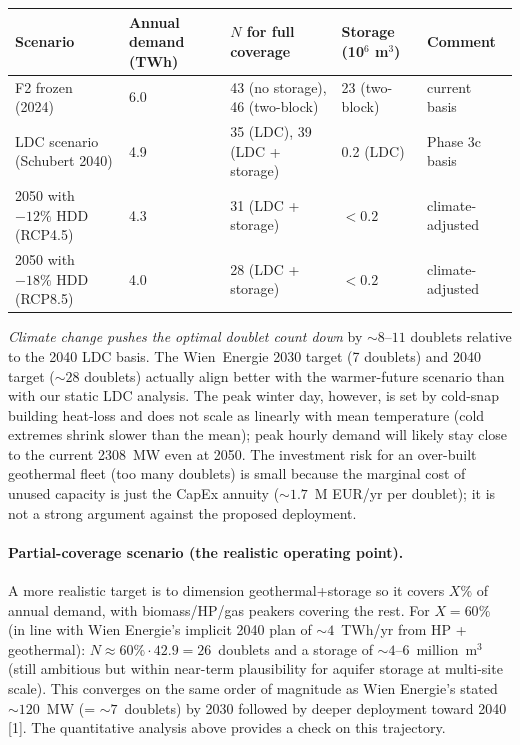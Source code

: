 \documentclass{article}
\begin{document}
\begin{center}
\begin{tabular}{lllll}
\hline
\textbf{Scenario} & \textbf{Annual demand (TWh)} & \textbf{$N$ for full coverage} & \textbf{Storage (10$^6$ m$^3$)} & \textbf{Comment} \\
\hline
F2 frozen (2024)              & 6.0  & 43 (no storage), 46 (two-block) & 23 (two-block) & current basis \\
LDC scenario (Schubert 2040)  & 4.9  & 35 (LDC), 39 (LDC + storage)    & 0.2 (LDC)      & Phase 3c basis \\
2050 with $-12\%$ HDD (RCP4.5) & 4.3 & 31 (LDC + storage)              & $< 0.2$         & climate-adjusted \\
2050 with $-18\%$ HDD (RCP8.5) & 4.0 & 28 (LDC + storage)              & $< 0.2$         & climate-adjusted \\
\hline
\end{tabular}
\end{center}

\emph{Climate change pushes the optimal doublet count \emph{down}}
by $\sim 8$--$11$ doublets relative to the 2040 LDC basis. The
Wien~Energie 2030 target (7 doublets) and 2040 target ($\sim 28$
doublets) actually align better with the warmer-future scenario
than with our static LDC analysis. The peak winter day, however,
is set by cold-snap building heat-loss and does not scale as
linearly with mean temperature (cold extremes shrink slower than
the mean); peak hourly demand will likely stay close to the current
2308~MW even at 2050. The investment risk for an over-built
geothermal fleet (too many doublets) is small because the marginal
cost of unused capacity is just the CapEx annuity ($\sim 1.7$~M
EUR/yr per doublet); it is not a strong argument against the
proposed deployment.

\paragraph{Partial-coverage scenario (the realistic operating point).}
A more realistic target is to dimension geothermal+storage so it
covers $X\%$ of annual demand, with biomass/HP/gas peakers
covering the rest. For $X=60\%$ (in line with Wien Energie's
implicit 2040 plan of $\sim 4$~TWh/yr from HP + geothermal):
$N\approx 60\% \cdot 42.9 = 26$~doublets and a storage of
$\sim 4$--$6$~million~m$^3$ (still ambitious but within
near-term plausibility for aquifer storage at multi-site scale).
This converges on the same order of magnitude as
Wien Energie's stated $\sim 120$~MW (= $\sim 7$~doublets) by
2030 followed by deeper deployment toward 2040 [1]. The
quantitative analysis above provides a check on this trajectory.
\end{document}
